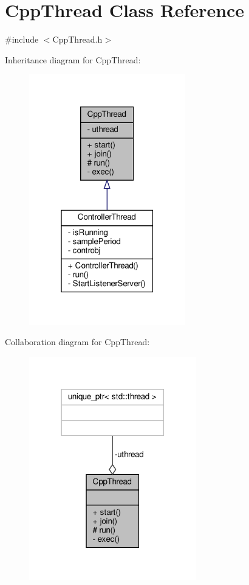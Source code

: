 \hypertarget{classCppThread}{}\section{Cpp\+Thread Class Reference}
\label{classCppThread}


{\ttfamily \#include $<$Cpp\+Thread.\+h$>$}



Inheritance diagram for Cpp\+Thread\+:\nopagebreak
\begin{figure}[H]
\begin{center}
\leavevmode
\includegraphics[width=193pt]{classCppThread__inherit__graph}
\end{center}
\end{figure}


Collaboration diagram for Cpp\+Thread\+:\nopagebreak
\begin{figure}[H]
\begin{center}
\leavevmode
\includegraphics[width=206pt]{classCppThread__coll__graph}
\end{center}
\end{figure}
